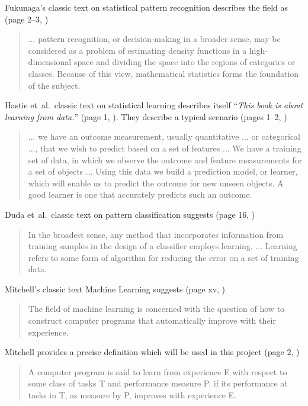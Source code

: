 \documentclass[a4paper, 11pt]{article}
\begin{document}
Fukunaga's classic text on statistical pattern recognition describes the field as (page 2--3, \cite{Fukunaga1990})

\begin{quotation}
... pattern recognition, or decision-making in a broader sense, may be considered as a problem of estimating density functions in a high-dimensional space and dividing the space into the regions of categories or classes. Because of this view, mathematical statistics forms the foundation of the subject.
\end{quotation} 

Hastie et~al.\ classic text on statistical learning describes itself ``\emph{This book is about learning from data.}'' (page 1, \cite{Hastie2009}). They describe a typical scenario (pages 1--2, \cite{Hastie2009})

\begin{quotation}
... we have an outcome measurement, usually quantitative ... or categorical ..., that we wish to predict based on a set of features ... We have a training set of data, in which we observe the outcome and feature measurements for a set of objects ... Using this data we build a prediction model, or learner, which will enable us to predict the outcome for new unseen objects. A good learner is one that accurately predicts such an outcome.
\end{quotation} 

Duda et~al.\ classic text on pattern classification suggests (page 16, \cite{Duda2001})

\begin{quotation}
In the broadest sense, any method that incorporates information from training samples in the design of a classifier employs learning. ... Learning refers to some form of algorithm for reducing the error on a set of training data.
\end{quotation}

Mitchell's classic text Machine Learning suggests (page xv, \cite{Mitchell1997})

\begin{quotation}
The field of machine learning is concerned with the question of how to construct computer programs that automatically improve with their experience.
\end{quotation}

Mitchell provides a precise definition which will be used in this project (page 2, \cite{Mitchell1997})

\begin{quotation}
A computer program is said to learn from experience E with respect to some class of tasks T and performance measure P, if its performance at tasks in T, as measure by P, improves with experience E.
\end{quotation}
\end{document}
